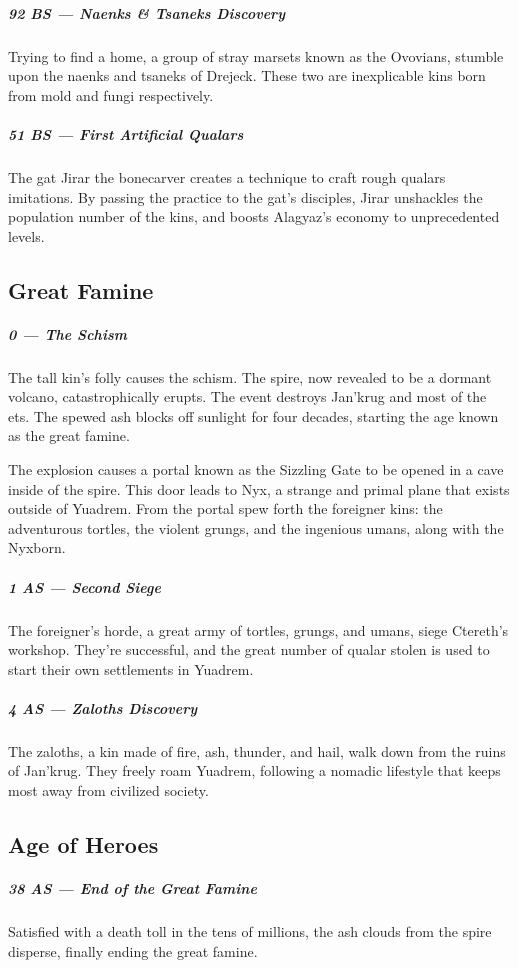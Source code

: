 \subparagraph{92 BS --- Naenks \& Tsaneks Discovery} Trying to find a home, a group of stray marsets known as the Ovovians, stumble upon the naenks and tsaneks of Drejeck.
These two are inexplicable kins born from mold and fungi respectively.

\subparagraph{51 BS --- First Artificial Qualars} The gat Jirar the bonecarver creates a technique to craft rough qualars imitations.
By passing the practice to the gat's disciples, Jirar unshackles the population number of the kins, and boosts Alagyaz's economy to unprecedented levels.

\subsection*{Great Famine}
\subparagraph{0 --- The Schism} The tall kin's folly causes the schism.
The spire, now revealed to be a dormant volcano, catastrophically erupts.
The event destroys Jan'krug and most of the ets.
The spewed ash blocks off sunlight for four decades, starting the age known as the great famine.

The explosion causes a portal known as the Sizzling Gate to be opened in a cave inside of the spire.
This door leads to Nyx, a strange and primal plane that exists outside of Yuadrem.
From the portal spew forth the foreigner kins: the adventurous tortles, the violent grungs, and the ingenious umans, along with the Nyxborn.

\subparagraph{1 AS --- Second Siege} The foreigner's horde, a great army of tortles, grungs, and umans, siege Ctereth's workshop.
They're successful, and the great number of qualar stolen is used to start their own settlements in Yuadrem.

\subparagraph{4 AS --- Zaloths Discovery} The zaloths, a kin made of fire, ash, thunder, and hail, walk down from the ruins of Jan'krug.
They freely roam Yuadrem, following a nomadic lifestyle that keeps most away from civilized society.

\subsection*{Age of Heroes}
\subparagraph{38 AS --- End of the Great Famine} Satisfied with a death toll in the tens of millions, the ash clouds from the spire disperse, finally ending the great famine.


